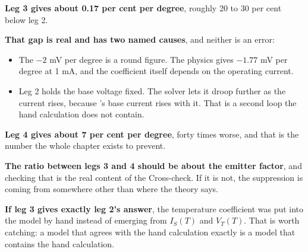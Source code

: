 \textbf{Leg 3 gives about 0.17 per cent per degree}, roughly 20 to 30 per cent below leg 2.

\textbf{That gap is real and has two named causes}, and neither is an error:

\begin{itemize}
  \item The $-2$ mV per degree is a round figure. The physics gives $-1.77$ mV per degree at 1 mA, and the coefficient itself depends on the operating current.
  \item Leg 2 holds the base voltage fixed. The solver lets it droop further as the current rises, because 's base current rises with it. That is a second loop the hand calculation does not contain.
\end{itemize}
\textbf{Leg 4 gives about 7 per cent per degree}, forty times worse, and that is the number the whole chapter exists to prevent.

\textbf{The ratio between legs 3 and 4 should be about the emitter factor}, and checking that is the real content of the Cross-check. If it is not, the suppression is coming from somewhere other than where the theory says.

\textbf{If leg 3 gives exactly leg 2's answer}, the temperature coefficient was put into the model by hand instead of emerging from $I_S(T)$ and $V_T(T)$. That is worth catching: a model that agrees with the hand calculation exactly is a model that contains the hand calculation.
